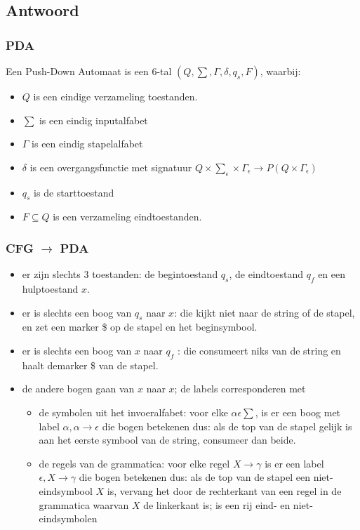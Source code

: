 \documentclass{article}
\begin{document}
    \subsection{Antwoord}
        \subsubsection{PDA}
            Een Push-Down Automaat is een 6-tal $(Q,\sum , \Gamma ,\delta , q_s, F)$, waarbij:
            \begin{itemize}
                \item $Q$ is een eindige verzameling toestanden.
                \item $\sum$ is een eindig inputalfabet
                \item $\Gamma$ is een eindig stapelalfabet
                \item $\delta$ is een overgangsfunctie met signatuur $Q \times \sum_{\epsilon} \times \Gamma_\epsilon \rightarrow P(Q \times \Gamma_\epsilon)$
                \item $q_s$ is de starttoestand
                \item $F \subseteq Q$ is een verzameling eindtoestanden.
            \end{itemize}

        \subsubsection{CFG $\rightarrow$ PDA}
            \begin{itemize}
                \item er zijn slechts 3 toestanden: de begintoestand $q_s$, de eindtoestand $q_f$ en een hulptoestand $x$.
                \item er is slechts een boog van $q_s$ naar $x$: die kijkt niet naar de string of de stapel, en zet een marker \$ op de stapel en het beginsymbool.
                \item er is slechts een boog van $x$ naar $q_f$ : die consumeert niks van de string en haalt demarker \$ van de stapel.
                \item de andere bogen gaan van $x$ naar $x$; de labels corresponderen met
                \begin{itemize}
                    \item de symbolen uit het invoeralfabet: voor elke $\alpha \epsilon \sum$, is er een boog met label $\alpha, \alpha \rightarrow \epsilon$ die bogen betekenen dus: als de top van de stapel gelijk is aan het eerste symbool van de string, consumeer dan beide.
                    \item de regels van de grammatica: voor elke regel $X \rightarrow \gamma$ is er een label $ \epsilon , X \rightarrow \gamma $ die bogen betekenen dus: als de top van de stapel een niet-eindsymbool $X$ is, vervang het door de rechterkant van een regel in de grammatica waarvan $X$ de linkerkant is; is een rij eind- en niet-eindsymbolen
                \end{itemize}
            \end{itemize}
\end{document}
